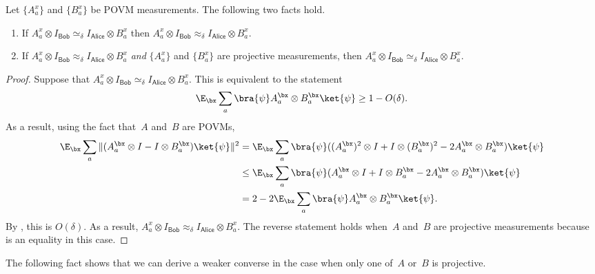 \documentclass[11pt]{article}
\newcommand{\consistency}{\simeq}
\newcommand{\reg}[1]{{\mathsf{#1}}}
\begin{document}
\begin{fact}\label{fact:agreement}
Let $\{A^x_a\}$ and $\{B^x_a\}$ be POVM measurements.
The following two facts hold.
\begin{enumerate}
\item If $A^x_a \otimes I_{\reg{Bob}} \consistency_{\delta} I_{\reg{Alice}} \otimes B^x_a$
	then $A^x_a \otimes I_{\reg{Bob}} \approx_{\delta} I_{\reg{Alice}} \otimes B^x_a$.
\item If $A^x_a \otimes I_{\reg{Bob}} \approx_{\delta} I_{\reg{Alice}} \otimes B^x_a$ \emph{and} $\{A^x_a\}$ and $\{B^x_a\}$ are projective measurements,
	then $A^x_a \otimes I_{\reg{Bob}} \consistency_{\delta} I_{\reg{Alice}} \otimes B^x_a$.\label{item:partial-converse}
\end{enumerate}
\end{fact}
\begin{proof}
Suppose that $A^x_a \otimes I_{\reg{Bob}} \consistency_{\delta} I_{\reg{Alice}} \otimes B^x_a$.
This is equivalent to the statement
\begin{equation}\label{eq:i-derived-a-formula}
\E_{\bx} \sum_a \bra{\psi} A^{\bx}_a \otimes B^{\bx}_a \ket{\psi} \geq 1- O(\delta).
\end{equation}
As a result, using the fact that~$A$ and~$B$ are POVMs,
\begin{align}
\E_{\bx} \sum_a \Vert (A_{a}^{\bx}\otimes I - I \otimes B_{a}^{\bx} ) \ket{\psi}\Vert^2 
& = \E_{\bx} \sum_a \bra{\psi} ((A_{a}^{\bx})^2\otimes I + I \otimes (B_{a}^{\bx})^2 - 2 A_a^{\bx} \otimes B_{a}^{\bx}) \ket{\psi}\nonumber\\
& \leq \E_{\bx} \sum_a \bra{\psi} (A_{a}^{\bx}\otimes I + I \otimes B_{a}^{\bx} - 2 A_a^{\bx} \otimes B_{a}^{\bx}) \ket{\psi}\label{eq:sometimes-tight}\\
& = 2 - 2 \E_{\bx} \sum_a \bra{\psi} A_a^{\bx} \otimes B_{a}^{\bx} \ket{\psi}\nonumber.
\end{align}
By , this is $O(\delta)$.
As a result, $A^x_a \otimes I_{\reg{Bob}} \approx_{\delta} I_{\reg{Alice}} \otimes B^x_a$.
The reverse statement holds when~$A$ and~$B$ are projective measurements
because  is an equality in this case.
\end{proof}

The following fact shows that we can derive a weaker converse in the case when only one of~$A$ or~$B$ is projective.
\end{document}

